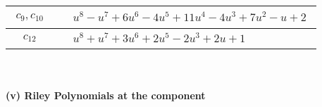 \documentclass[1p]{elsarticle_modified}
\theoremstyle{definition}
\begin{document}
\begin{tabular}{m{50pt}|m{274pt}}
\hline $$\begin{aligned}c_{9},c_{10}\end{aligned}$$&$\begin{aligned}
&u^8- u^7+6 u^6-4 u^5+11 u^4-4 u^3+7 u^2- u+2
\end{aligned}$\\
\hline $$\begin{aligned}c_{12}\end{aligned}$$&$\begin{aligned}
&u^8+u^7+3 u^6+2 u^5-2 u^3+2 u+1
\end{aligned}$\\
\hline
\end{tabular}\\~\\
\newpage\renewcommand{\arraystretch}{1}
\flushleft \textbf{(v) Riley Polynomials at the component}\newline \\
\end{document}
